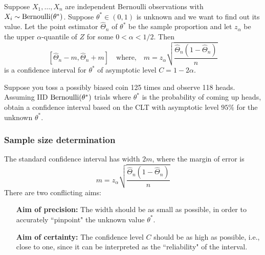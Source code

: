 \begin{prop}
\label{prop-asy-confid-level-two-sided}Suppose 
$X_{1},\ldots ,X_{n}$ are independent Bernoulli observations with $X_{i}\sim \mbox{{\rm Bernoulli}}(\theta^*)$.  
Suppose $\theta^*\in (0,1)$ is unknown and we want to find out its value. 
Let the point estimator $\widehat{\Theta}_{n}$ of $\theta^*$ be the sample proportion and let $%
z_{\alpha}$ be the upper $\alpha $-quantile of $Z$ for some $%
0<\alpha <1/2$. Then 
\begin{equation*}
 \left[ \widehat{\Theta}_{n}-m,\widehat{\Theta}_{n}+m\right] \quad \text{where,} \quad m=z_{\alpha}\sqrt{\frac{\widehat{\Theta}_{n}(1-\widehat{\Theta}_{n})}{n}}
\end{equation*}%
is a confidence interval for $\theta^*$ of asymptotic level $C=1-2\alpha $.
\end{prop}

\begin{Exercise}[label={ExAsymptoticConfIntervalsFor125BernoulliTrials}]
Suppose you toss a possibly biased coin 125 times and observe 118 heads. Assuming IID $\mbox{{\rm Bernoulli}}(\theta^*)$ trials where $\theta^*$ is the probability of coming up heads, obtain a confidence interval based on the CLT with asymptotic level $95\%$ for the unknown $\theta^*$.
\end{Exercise}


\subsubsection{Sample size determination}\label{S:SampleSizeDetermination}

The standard confidence interval has width $2m$, where the margin of error
is 
\begin{equation}
m=z_{\alpha}\sqrt{\frac{\widehat{\Theta}_{n}(1-\widehat{\Theta}_{n})}{n}}
\label{standard-margin-a}
\end{equation}
There are two conflicting aims:

\begin{itemize}
\item[{\bf Aim of precision:}] The width should be as small as possible, in order to accurately ``pinpoint" the unknown value $\theta^*$.

\item[{\bf Aim of certainty:}] The confidence level $C$ should be as high as possible, i.e., close to one, since it can be interpreted as the ``reliability" of the interval.
\end{itemize}

